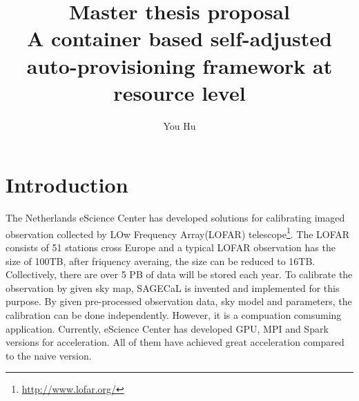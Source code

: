 \documentclass[sigchi]{acmart}
\begin{document}
\title{Master thesis proposal \\
       A container based self-adjusted auto-provisioning framework 
        at resource level}

\author{You Hu}



\renewcommand{\shortauthors}{You Hu}






\maketitle

\section{Introduction}
The Netherlands eScience Center has developed solutions for calibrating imaged observation collected by LOw Frequency Array(LOFAR) telescope\footnote{\url{http://www.lofar.org/}}.
The LOFAR consists of 51 stations cross Europe and a typical LOFAR observation has the size of 100TB, after friquency averaing, the size can be reduced to 16TB. \cite{Spreeuw2019}
Collectively, there are over 5 PB of data will be stored each year. \cite{Start2020} To calibrate the observation by given sky map, SAGECaL is invented and implemented for this purpose.\cite{Kazemi2011}
By given pre-processed observation data, sky model and parameters, the calibration can be done independently. However, it is a compuation comsuming application. Currently, eScience Center has developed GPU, MPI and Spark versions for acceleration.
All of them have achieved great acceleration compared to the naive version. 
\end{document}
